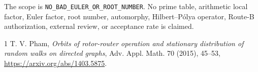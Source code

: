 \documentclass[10pt]{article}
\begin{document}
The scope is \texttt{NO\_BAD\_EULER\_OR\_ROOT\_NUMBER}.  No prime table,
arithmetic local factor, Euler factor, root number, automorphy,
Hilbert--P\'olya operator, Route-B authorization, external review, or
acceptance rate is claimed.

\begin{thebibliography}{1}
T. V. Pham, \emph{Orbits of rotor-router operation and stationary distribution
of random walks on directed graphs}, Adv. Appl. Math. 70 (2015), 45--53,
\url{https://arxiv.org/abs/1403.5875}.
\end{thebibliography}
\end{document}
